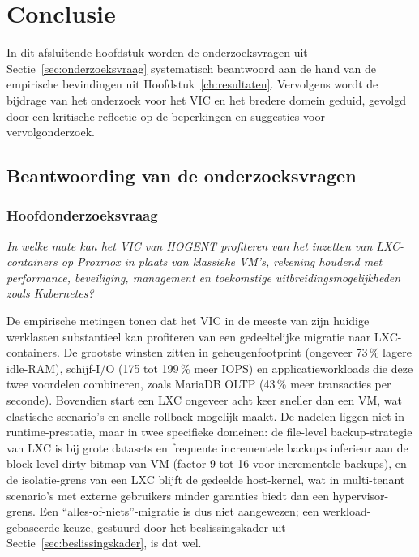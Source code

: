 
\chapter{Conclusie}%
\label{ch:conclusie}

In dit afsluitende hoofdstuk worden de onderzoeksvragen uit Sectie~\ref{sec:onderzoeksvraag} systematisch beantwoord aan de hand van de empirische bevindingen uit Hoofdstuk~\ref{ch:resultaten}. Vervolgens wordt de bijdrage van het onderzoek voor het VIC en het bredere domein geduid, gevolgd door een kritische reflectie op de beperkingen en suggesties voor vervolgonderzoek.

\section{Beantwoording van de onderzoeksvragen}
\label{sec:beantwoording-vragen}

\subsection*{Hoofdonderzoeksvraag}
\textit{In welke mate kan het VIC van HOGENT profiteren van het inzetten van LXC-containers op Proxmox in plaats van klassieke VM's, rekening houdend met performance, beveiliging, management en toekomstige uitbreidingsmogelijkheden zoals Kubernetes?}

De empirische metingen tonen dat het VIC in de meeste van zijn huidige werklasten substantieel kan profiteren van een gedeeltelijke migratie naar LXC-containers. De grootste winsten zitten in geheugenfootprint (ongeveer 73\,\% lagere idle-RAM), schijf-I/O (175 tot 199\,\% meer IOPS) en applicatieworkloads die deze twee voordelen combineren, zoals MariaDB OLTP (43\,\% meer transacties per seconde). Bovendien start een LXC ongeveer acht keer sneller dan een VM, wat elastische scenario's en snelle rollback mogelijk maakt. De nadelen liggen niet in runtime-prestatie, maar in twee specifieke domeinen: de file-level backup-strategie van LXC is bij grote datasets en frequente incrementele backups inferieur aan de block-level dirty-bitmap van VM (factor 9 tot 16 voor incrementele backups), en de isolatie-grens van een LXC blijft de gedeelde host-kernel, wat in multi-tenant scenario's met externe gebruikers minder garanties biedt dan een hypervisor-grens. Een ``alles-of-niets''-migratie is dus niet aangewezen; een werkload-gebaseerde keuze, gestuurd door het beslissingskader uit Sectie~\ref{sec:beslissingskader}, is dat wel.

